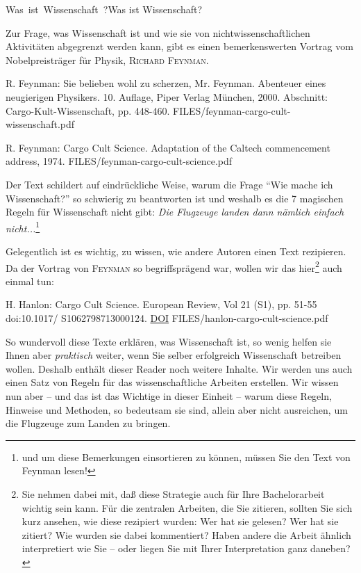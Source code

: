 

\unit{Was ist Wissenschaft?}{Was ist Wissenschaft?}

Zur Frage, was Wissenschaft ist und wie sie von nichtwissenschaftlichen Aktivitäten abgegrenzt werden kann,
gibt es einen bemerkenswerten Vortrag vom Nobelpreisträger für Physik, \textsc{Richard Feynman}.

{R. Feynman: Sie belieben wohl zu scherzen, Mr. Feynman. Abenteuer eines neugierigen Physikers.
10. Auflage, Piper Verlag München, 2000.
Abschnitt: Cargo-Kult-Wissenschaft, pp. 448-460.}
{FILES/feynman-cargo-cult-wissenschaft.pdf}
{}

{R. Feynman: Cargo Cult Science. Adaptation of the Caltech commencement address, 1974.}
{FILES/feynman-cargo-cult-science.pdf}
{}

Der Text schildert auf eindrückliche Weise, warum die Frage
\enquote{Wie mache ich Wissenschaft?} so schwierig zu beantworten ist und weshalb es
die 7 magischen Regeln für Wissenschaft nicht gibt:
\textit{Die Flugzeuge landen dann nämlich einfach nicht...}\footnote{und um diese
Bemerkungen einsortieren zu können, müssen Sie den Text von Feynman lesen!}

Gelegentlich ist es wichtig, zu wissen, wie andere
Autoren einen Text rezipieren. Da
der Vortrag von \textsc{Feynman} so 
begriffsprägend war, wollen wir das 
hier\footnote{Sie nehmen dabei mit, daß diese
Strategie auch für Ihre Bachelorarbeit
wichtig sein kann. Für die zentralen 
Arbeiten, die Sie zitieren, sollten Sie sich kurz ansehen, wie diese rezipiert wurden:
Wer hat sie gelesen? Wer hat sie zitiert? Wie wurden sie dabei kommentiert?
Haben andere die Arbeit ähnlich interpretiert wie
Sie -- oder liegen Sie mit Ihrer Interpretation ganz daneben?} auch
einmal tun:


{H. Hanlon: Cargo Cult Science.
European Review, Vol 21 (S1), pp. 51-55
doi:10.1017/ S1062798713000124.
\href{https://doi.org/10.1017/S1062798713000124}{DOI}}
{FILES/hanlon-cargo-cult-science.pdf}
{\href{https://www.cambridge.org/core/journals/european-review/article/cargo-cult-science/38CA581FFAB42704E5F667AA4A2D6D79}{\online}}

So wundervoll diese Texte erklären, was Wissenschaft ist, so wenig helfen sie Ihnen aber \textit{praktisch} weiter,
wenn Sie selber erfolgreich Wissenschaft betreiben wollen. Deshalb enthält dieser
Reader noch weitere Inhalte. Wir werden uns auch einen Satz von Regeln für das wissenschaftliche Arbeiten erstellen. 
Wir wissen nun aber -- und das ist das Wichtige
in dieser Einheit -- warum diese Regeln, Hinweise und Methoden, so bedeutsam sie sind, allein 
aber nicht ausreichen, um die Flugzeuge zum Landen zu bringen.

